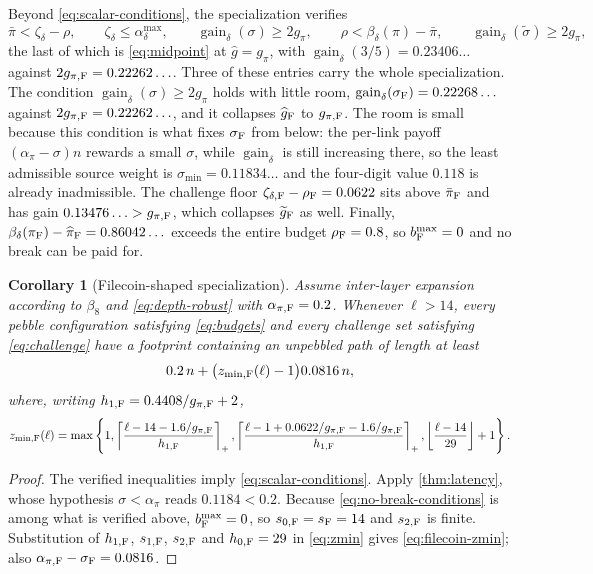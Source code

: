 \documentclass[11pt]{article}
\theoremstyle{plain}
\newtheorem{corollary}{Corollary}
\theoremstyle{remark}
\newcommand{\gaind}{\operatorname{gain}_{\delta}}
\newcommand{\gpi}{g_{\pi}}
\newcommand{\ghat}{\widehat g}
\newcommand{\gtilde}{\widetilde g}
\newcommand{\pihat}{\widehat{\pi}}
\newcommand{\sigmatilde}{\widetilde{\sigma}}
\begin{document}
Beyond \eqref{eq:scalar-conditions}, the specialization verifies
\begin{equation}
 \bar\pi<\zeta_\delta-\rho,\qquad
 \zeta_\delta\le\alpha_\delta^{\max},\qquad
 \gaind(\sigma)\ge2\gpi,\qquad
 \rho<\beta_\delta(\pi)-\bar\pi,\qquad
 \gaind(\sigmatilde)\ge2\gpi ,
 \label{eq:no-break-conditions}
\end{equation}
the last of which is \eqref{eq:midpoint} at \(\ghat=\gpi\), with
\(\gaind(3/5)=0.23406\ldots\) against \(2g_{\pi,{\rm F}}=0.22262\ldots\).  Three of
these entries carry the whole specialization.  The condition
\(\gaind(\sigma)\ge2\gpi\) holds with little room,
\(\gaind(\sigma_{\rm F})=0.22268\ldots\) against
\(2g_{\pi,{\rm F}}=0.22262\ldots\), and it collapses \(\ghat_{\rm F}\) to
\(g_{\pi,{\rm F}}\).  The room is small because this condition is what fixes
\(\sigma_{\rm F}\) from below: the per-link payoff \((\alpha_\pi-\sigma)n\) rewards a
small \(\sigma\), while \(\gaind\) is still increasing there, so the least admissible
source weight is \(\sigma_{\min}=0.11834\ldots\) and the four-digit value \(0.118\) is
already inadmissible.  The challenge floor
\(\zeta_{\delta,{\rm F}}-\rho_{\rm F}=0.0622\) sits above \(\bar\pi_{\rm F}\) and has
gain \(0.13476\ldots>g_{\pi,{\rm F}}\), which collapses \(\gtilde_{\rm F}\) as well.
Finally, \(\beta_\delta(\pi_{\rm F})-\pihat_{\rm F}=0.86042\ldots\) exceeds the entire
budget \(\rho_{\rm F}=0.8\), so \(b^{\max}_{\rm F}=0\) and no break can be paid for.

\begin{corollary}[Filecoin-shaped specialization]
\label{cor:filecoin}
Assume inter-layer expansion according to \(\beta_8\) and
\eqref{eq:depth-robust} with \(\alpha_{\pi,{\rm F}}=0.2\).  Whenever \(\ell>14\), every
pebble configuration satisfying \eqref{eq:budgets} and every challenge set satisfying
\eqref{eq:challenge} have a footprint containing an unpebbled path of length at least
\[
 0.2\,n+\bigl(z_{\min,{\rm F}}(\ell)-1\bigr)0.0816\,n,
\]
where, writing \(h_{1,{\rm F}}=0.4408/g_{\pi,{\rm F}}+2\),
\begin{equation}
 z_{\min,{\rm F}}(\ell)=\max\left\{1,
 \left\lceil\frac{\ell-14-1.6/g_{\pi,{\rm F}}}{h_{1,{\rm F}}}\right\rceil_+,
 \left\lceil\frac{\ell-1+0.0622/g_{\pi,{\rm F}}-1.6/g_{\pi,{\rm F}}}
   {h_{1,{\rm F}}}\right\rceil_+,
 \left\lfloor\frac{\ell-14}{29}\right\rfloor+1\right\}.
 \label{eq:filecoin-zmin}
\end{equation}
\end{corollary}

\begin{proof}
The verified inequalities imply \eqref{eq:scalar-conditions}.  Apply
\cref{thm:latency}, whose hypothesis \(\sigma<\alpha_\pi\) reads
\(0.1184<0.2\).  Because \eqref{eq:no-break-conditions} is among what is verified
above, \(b^{\max}_{\rm F}=0\), so
\(s_{0,{\rm F}}=s_{\rm F}=14\) and \(s_{2,{\rm F}}\) is finite.
Substitution of \(h_{1,{\rm F}}\), \(s_{1,{\rm F}}\), \(s_{2,{\rm F}}\) and
\(h_{0,{\rm F}}=29\) in \eqref{eq:zmin} gives
\eqref{eq:filecoin-zmin}; also
\(\alpha_{\pi,{\rm F}}-\sigma_{\rm F}=0.0816\).
\end{proof}
\end{document}
